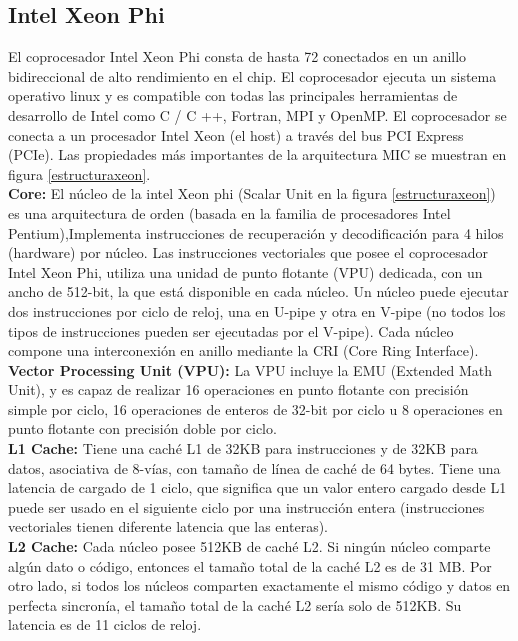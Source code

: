 \subsection{Intel Xeon Phi}

El coprocesador Intel Xeon Phi \cite{xeonphi1} \cite{wange2014} \cite{xeonphila} consta de hasta 72 conectados en un anillo bidireccional de alto rendimiento en el chip. El coprocesador ejecuta un sistema operativo linux y es compatible con todas las principales herramientas de desarrollo de Intel como C / C ++, Fortran, MPI y OpenMP. El coprocesador se conecta a un procesador Intel Xeon (el host) a través del bus PCI Express (PCIe). Las propiedades más importantes de la arquitectura MIC se muestran en figura \ref{estructuraxeon}.\\

\textbf{Core:} El núcleo de la intel Xeon phi (Scalar Unit en la figura \ref{estructuraxeon}) es una arquitectura de orden (basada en la familia de procesadores Intel Pentium),Implementa instrucciones de recuperación y decodificación para 4 hilos (hardware) por núcleo. Las instrucciones vectoriales que posee el coprocesador Intel Xeon Phi, utiliza una unidad de punto flotante (VPU) dedicada, con un ancho de 512-bit, la que está disponible en cada núcleo. Un núcleo puede ejecutar dos instrucciones por ciclo de reloj, una en U-pipe y otra en V-pipe (no todos los tipos de instrucciones pueden ser ejecutadas por el V-pipe). Cada núcleo compone una interconexión en anillo mediante la CRI (Core Ring Interface).\\

\textbf{Vector Processing Unit (VPU):} La VPU incluye la EMU (Extended Math Unit), y es capaz de realizar 16
operaciones en punto flotante con precisión simple por ciclo, 16 operaciones de enteros de 32-bit por ciclo u
8 operaciones en punto flotante con precisión doble por ciclo.\\

\textbf{L1 Cache:} Tiene una caché L1 de 32KB para instrucciones y de 32KB para datos, asociativa de 8-vías,
con tamaño de línea de caché de 64 bytes. Tiene una latencia de cargado de 1 ciclo, que significa que un valor
entero cargado desde L1 puede ser usado en el siguiente ciclo por una instrucción entera (instrucciones vectoriales
tienen diferente latencia que las enteras).\\

\textbf{L2 Cache:} Cada núcleo posee 512KB de caché L2. Si ningún núcleo comparte algún dato o código, entonces el
tamaño total de la caché L2 es de 31 MB. Por otro lado, si todos los núcleos comparten exactamente el mismo
código y datos en perfecta sincronía, el tamaño total de la caché L2 sería solo de 512KB. Su latencia es de 11
ciclos de reloj.\\

